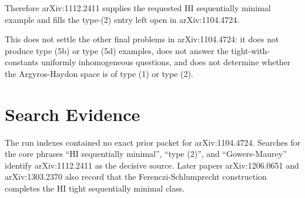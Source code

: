 \documentclass[11pt]{article}
\begin{document}
Therefore arXiv:1112.2411 supplies the requested HI sequentially minimal
example and fills the type-(2) entry left open in arXiv:1104.4724.

This does not settle the other final problems in arXiv:1104.4724: it does not
produce type (5b) or type (5d) examples, does not answer the tight-with-
constants uniformly inhomogeneous questions, and does not determine whether
the Argyros-Haydon space is of type (1) or type (2).

\section*{Search Evidence}

The run indexes contained no exact prior packet for arXiv:1104.4724.  Searches
for the core phrases ``HI sequentially minimal'', ``type (2)'', and
``Gowers-Maurey'' identify arXiv:1112.2411 as the decisive source.  Later
papers arXiv:1206.0651 and arXiv:1303.2370 also record that the
Ferenczi-Schlumprecht construction completes the HI tight sequentially minimal
class.
\end{document}
